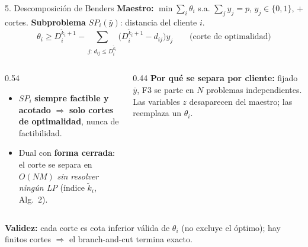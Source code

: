 \documentclass[10pt,aspectratio=169]{beamer}
\newcommand{\kt}{\tilde{k}}
\begin{document}
\begin{frame}{5. Descomposición de Benders}
\textbf{Maestro:} $\min\sum_i\theta_i$ s.a. $\sum_j y_j=p$, $y_j\in\{0,1\}$, + cortes.
\quad\textbf{Subproblema} $SP_i(\bar y)$: distancia del cliente $i$.
\[
  \theta_i \ge D^{\kt_i+1}_i-\!\!\sum_{j:\,d_{ij}\le D^{\kt_i}_i}\!\!\big(D^{\kt_i+1}_i-d_{ij}\big)y_j
  \qquad\text{(corte de optimalidad)}
\]
\begin{columns}
\begin{column}{0.54\textwidth}
\begin{itemize}
  \item $SP_i$ \textbf{siempre factible y acotado} $\Rightarrow$ \textbf{solo cortes de
        optimalidad}, nunca de factibilidad.
  \item Dual con \textbf{forma cerrada}: el corte se separa en $O(NM)$ \emph{sin resolver ningún
        LP} (índice $\kt_i$, Alg.\ 2).
\end{itemize}
\end{column}
\begin{column}{0.44\textwidth}
\footnotesize
\textbf{Por qué se separa por cliente:} fijado $\bar y$, F3 se parte en $N$ problemas
independientes. Las variables $z$ desaparecen del maestro; las reemplaza un $\theta_i$.
\end{column}
\end{columns}
\vfill
\footnotesize \textbf{Validez:} cada corte es cota inferior válida de $\theta_i$ (no excluye el
óptimo); hay finitos cortes $\Rightarrow$ el branch-and-cut termina exacto.
\end{frame}
\end{document}
